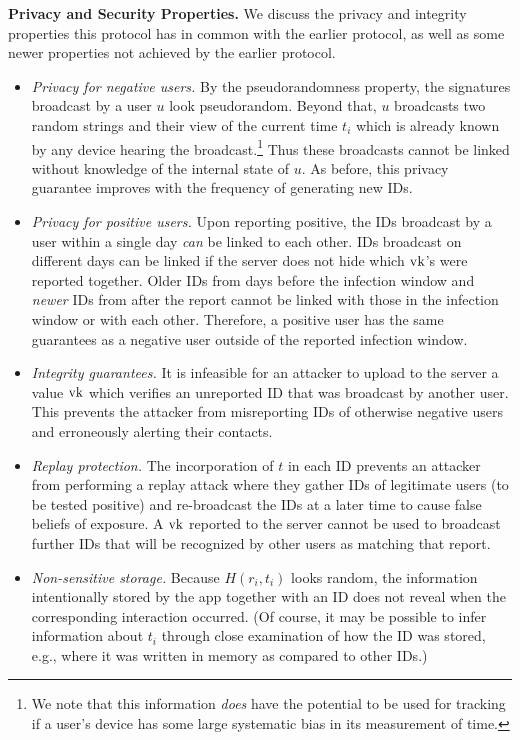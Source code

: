 \documentclass{article}
\begin{document}
{\bf Privacy and Security Properties.} We discuss the privacy and integrity properties this protocol has in common with the earlier protocol, as well as some newer properties not achieved by the earlier protocol.\begin{itemize}
    \item {\em Privacy for negative users.} 
	 By the pseudorandomness property, the signatures broadcast by a user $u$ look pseudorandom. Beyond that, $u$ broadcasts two random strings and their view of the current time $t_i$ which is already known by any device hearing the broadcast.\footnote{We note that this information \emph{does} have the potential to be used for tracking if a user's device has some large systematic bias in its measurement of time.} Thus these broadcasts cannot be linked without knowledge of the internal state of $u$. As before, this privacy guarantee improves with the frequency of generating new IDs.
    \item {\em Privacy for positive users.} Upon reporting positive, the IDs broadcast by a user within a single day {\em can} be linked to each other. IDs broadcast on different days can be linked if the server does not hide which $\mathrm{vk}$'s were reported together. Older IDs from days before the infection window and {\em newer} IDs from after the report cannot be linked with those in the infection window or with each other. Therefore, a positive user has the same guarantees as a negative user outside of the reported infection window.
    \item {\em Integrity guarantees.} It is infeasible for an attacker to upload to the server a value $\mathrm{vk}$ which verifies an unreported ID that was broadcast by another user. This prevents the attacker from misreporting IDs of otherwise negative users and erroneously alerting their contacts.
    \item {\em Replay protection.} The incorporation of $t$ in each ID prevents an attacker from performing a replay attack where they gather IDs of legitimate users (to be tested positive) and re-broadcast the IDs at a later time to cause false beliefs of exposure. A $\mathrm{vk}$ reported to the server cannot be used to broadcast further IDs that will be recognized by other users as matching that report.
    \item {\em Non-sensitive storage.} Because $H(r_i, t_i)$ looks random, the information intentionally stored by the app together with an ID does not reveal when the corresponding interaction occurred. (Of course, it may be possible to infer information about $t_i$ through close examination of how the ID was stored, e.g., where it was written in memory as compared to other IDs.)
\end{itemize}
\end{document}
